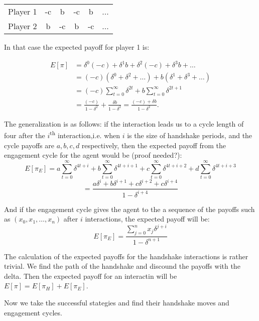 \begin{table}[H]
\begin{center}
\begin{tabular}{lccccc}
Player 1 & -c & b  & -c & b & ...\\
Player 2 & b & -c & b  & -c  & ...\\
\end{tabular}
\end{center}
\end{table}
In that case the expected payoff for player 1 is:

\begin{align*}
E[\pi] &= \delta^0(-c)+\delta^1b+\delta^2(-c)+\delta^3b+\dots \\
       &= (-c)(\delta^0+\delta^2+\dots) + b(\delta^1+\delta^3+\dots) \\
       &= (-c) \sum_{t=0}^{\infty}\delta^{2t} + b \sum_{t=0}^{\infty}\delta^{2t+1}  \\
       &= \frac{(-c)}{1-\delta^2} + \frac{\delta b}{1-\delta^2}=\frac{(-c)+\delta b}{1-\delta^2}.
\end{align*}

The generalization is as follows: if the interaction leads us to a cycle length of four after the  $i$\textsuperscript{th} interaction,i.e. when $i$ is the size of handshake periods, and the cycle payoffs are  $a,b,c,d$ respectively, then the expected payoff from the engagement cycle for the agent would be (proof needed?):
$$E[\pi_E]=a\sum_{t=0}^{\infty}\delta^{4t+i}+b\sum_{t=0}^{\infty}\delta^{4t+i+1}+c\sum_{t=0}^{\infty}\delta^{4t+i+2}+d\sum_{t=0}^{\infty}\delta^{4t+i+3}$$
$$=\frac{a\delta^i+b\delta^{i+1}+c\delta^{i+2}+c\delta^{i+4}}{1-\delta^{i+4}}$$  

And if the engagement cycle gives the agent to the a sequence of the payoffs such as  $(x_0,x_1,\dots,x_n)$ after $i$ interactions, the expected payoff will be:
$$E[\pi_E]=\frac{\sum_{j=0}^{n}x_j\delta^{j+i}}{1-\delta^{n+1}}$$

The calculation of the expected payoffs for the handshake interactions is rather trivial. We find the path of the handshake and discound the payoffs with the delta. Then the expected payoff for an interactin will be $E[\pi] = E[\pi_H] + E[\pi_E]$.

Now we take the successful stategies and find their handshake moves and engagement cycles.


\newcommand{\me}{\textsuperscript}
\newcommand{\ot}{\textsubscript}
\newcommand{\no}{$\varnothing$}


